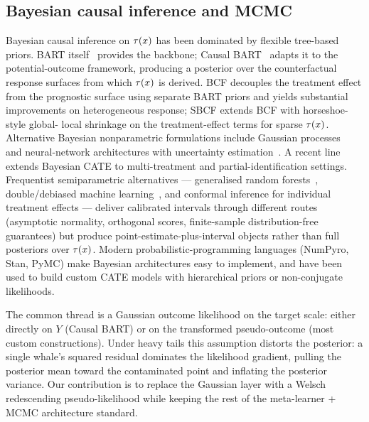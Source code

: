 \subsection{Bayesian causal inference and MCMC}
\label{sec:related:bayesian}
Bayesian causal inference on $\tau(x)$ has been dominated by flexible
tree-based priors. BART itself~\citep{chipman2010bart} provides the
backbone; Causal BART~\citep{hill2011bayesian} adapts it to the
potential-outcome framework, producing a posterior over the
counterfactual response surfaces from which $\tau(x)$ is derived. BCF
\citep{hahn2020bcf} decouples the treatment effect from the
prognostic surface using separate BART priors and yields substantial
improvements on heterogeneous response; SBCF
\citep{caron2022shrinkage} extends BCF with horseshoe-style global-
local shrinkage on the treatment-effect terms for sparse $\tau(x)$.
Alternative Bayesian nonparametric formulations include Gaussian
processes~\citep{alaa2018gp} and neural-network architectures with
uncertainty estimation~\citep{shi2019adapting,jesson2021uncertainty}.
A recent line~\citep{zheng2022bayesian} extends Bayesian CATE to
multi-treatment and partial-identification settings.
Frequentist semiparametric alternatives --- generalised random
forests~\citep{athey2019generalized}, double/debiased machine
learning~\citep{chernozhukov2018double}, and conformal inference for
individual treatment effects
\citep{lei2021conformal,alaa2023conformal,jin2023sensitivity} ---
deliver calibrated intervals through different routes (asymptotic
normality, orthogonal scores, finite-sample distribution-free
guarantees) but produce point-estimate-plus-interval objects rather
than full posteriors over $\tau(x)$.
Modern probabilistic-programming languages (NumPyro, Stan, PyMC)
make Bayesian architectures easy to implement, and have been used to
build custom CATE models with hierarchical priors or non-conjugate
likelihoods.

The common thread is a Gaussian outcome likelihood on the target
scale: either directly on $Y$ (Causal BART) or on the transformed
pseudo-outcome (most custom constructions). Under heavy tails this
assumption distorts the posterior: a single whale's squared residual
dominates the likelihood gradient, pulling the posterior mean toward
the contaminated point and inflating the posterior variance. Our
contribution is to replace the Gaussian layer with a Welsch
redescending pseudo-likelihood while keeping the rest of the
meta-learner + MCMC architecture standard.

